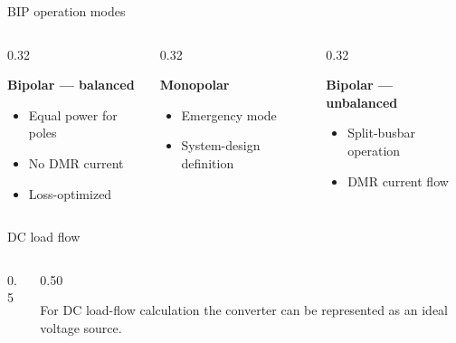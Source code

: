 \begin{frame}{BIP operation modes}
  \begin{columns}[T,onlytextwidth]
    \begin{column}{0.32\textwidth}\centering
      \\[0.3em]
      {\footnotesize\textbf{Bipolar --- balanced}\\ 
      \begin{itemize}
        \item Equal power for poles
        \item No DMR current
        \item Loss-optimized
      \end{itemize}
      }
    \end{column}
    \begin{column}{0.32\textwidth}\centering
      \\[0.3em]
      {\footnotesize\textbf{Monopolar}\\
      \begin{itemize}
        \item Emergency mode
        \item System-design definition
      \end{itemize}
      }
    \end{column}
    \begin{column}{0.32\textwidth}\centering
      \\[0.3em]
      {\footnotesize\textbf{Bipolar --- unbalanced}\\
      \begin{itemize}
        \item Split-busbar operation
        \item DMR current flow
      \end{itemize}
      }
    \end{column}
  \end{columns}
\end{frame}

\begin{frame}{DC load flow}
  \begin{columns}[c,onlytextwidth]
    \begin{column}{0.5\textwidth}\centering
      
    \end{column}
    \begin{column}{0.50\textwidth}
      {\centering
      \\[0.4em]}

      For DC load-flow calculation the converter can be represented as an ideal voltage source.
    \end{column}
  \end{columns}
\end{frame}

